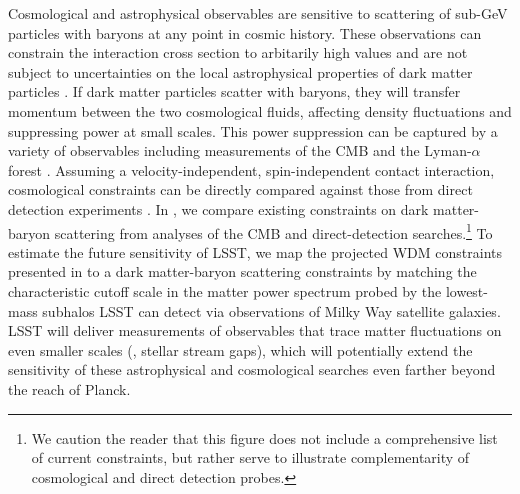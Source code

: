 
Cosmological and astrophysical observables are sensitive to scattering of sub-GeV particles with baryons at any point in cosmic history. 
These observations can constrain the interaction cross section to arbitarily high values and are not subject to uncertainties on the local astrophysical properties of dark matter particles \citep[\eg,][]{1210.2721,1404.1938}. 
If dark matter particles scatter with baryons, they will transfer momentum between the two cosmological fluids, affecting density fluctuations and suppressing power at small scales. 
This power suppression can be captured by a variety of observables including measurements of the CMB \citep{1311.2937,Gluscevic:2017ywp} and the Lyman-$\alpha$ forest \citep{Xu:2018efh}.
Assuming a velocity-independent, spin-independent contact interaction, cosmological constraints can be directly compared against those from direct detection experiments \citep[\eg,][]{Boddy:2018kfv}.
In , we compare existing constraints on dark matter-baryon scattering from analyses of the CMB and direct-detection searches.\footnote{We caution the reader that this figure does not include a comprehensive list of current constraints, but rather serve to illustrate complementarity of cosmological and direct detection probes.} 
To estimate the future sensitivity of LSST, we map the projected WDM constraints presented in  to a dark matter-baryon scattering constraints by matching the characteristic cutoff scale in the matter power spectrum probed by the lowest-mass subhalos LSST can detect via observations of Milky Way satellite galaxies. 
LSST will deliver measurements of observables that trace matter fluctuations on even smaller scales (\eg, stellar stream gaps), which will potentially extend the sensitivity of these astrophysical and cosmological searches even farther beyond the reach of Planck.
